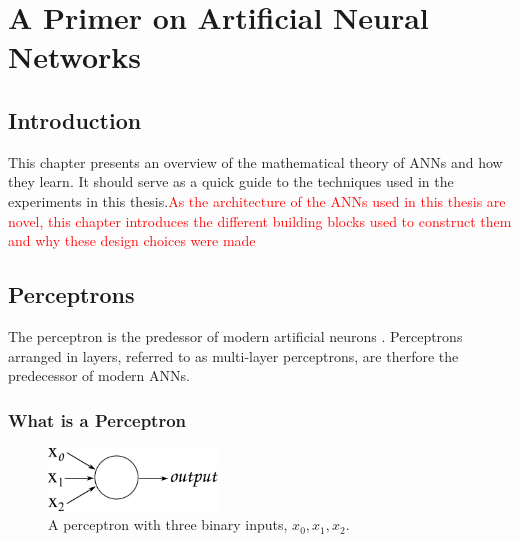 \chapter{A Primer on Artificial Neural Networks} %

\label{Chapter2} %


\section{Introduction}
This chapter presents an overview of the mathematical theory of \acp{ANN} and how they learn. It should serve as a quick guide to the techniques used in the experiments in this thesis.\textcolor{red}{As the architecture of the \acp{ANN} used in this thesis are novel, this chapter introduces the different building blocks used to construct them and why these design choices were made}

\section{Perceptrons}
\label{sec:percep}
The perceptron is the predessor of modern artificial neurons \cite{rosenblatt1958perceptron}.
Perceptrons arranged in layers, referred to as multi-layer perceptrons, are therfore the predecessor of modern \acp{ANN}.

\subsection{What is a Perceptron}



\begin{figure}
	\centering
	\includegraphics[width=0.4\textwidth]{Figs/intro2dl/perceptron.png}
	
	\caption{A perceptron with three binary inputs, $x_0, x_1, x_2$.}
	\label{fig:perceptron}
\end{figure}

